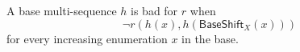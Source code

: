 \begin{definition}
A base multi-sequence $h$ is bad for $r$ when
\[
\neg r(h(x),h(\mathsf{BaseShift}_X(x)))
\]
for every increasing enumeration $x$ in the base.
\end{definition}
